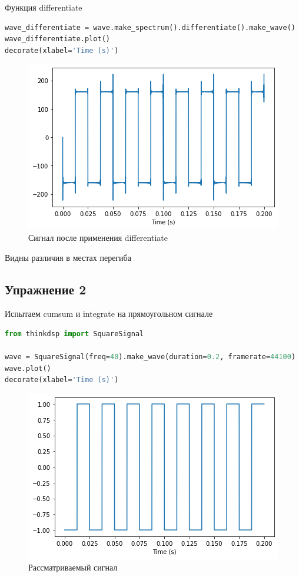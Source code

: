 Функция differentiate

\begin{lstlisting}[language=Python]
wave_differentiate = wave.make_spectrum().differentiate().make_wave()
wave_differentiate.plot()
decorate(xlabel='Time (s)')
\end{lstlisting}

\begin{figure}[H]
	\begin{center}
		\includegraphics[scale=1]{fig/lab09/lab09_03.png}
		\caption{Сигнал после применения differentiate}
	\end{center}
\end{figure}

Видны различия в местах перегиба

\subsection{Упражнение 2}

Испытаем cumsum и integrate на прямоугольном сигнале

\begin{lstlisting}[language=Python]
from thinkdsp import SquareSignal

wave = SquareSignal(freq=40).make_wave(duration=0.2, framerate=44100)
wave.plot()
decorate(xlabel='Time (s)')
\end{lstlisting}

\begin{figure}[H]
	\begin{center}
		\includegraphics[scale=1]{fig/lab09/lab09_04.png}
		\caption{Рассматриваемый сигнал}
	\end{center}
\end{figure}

